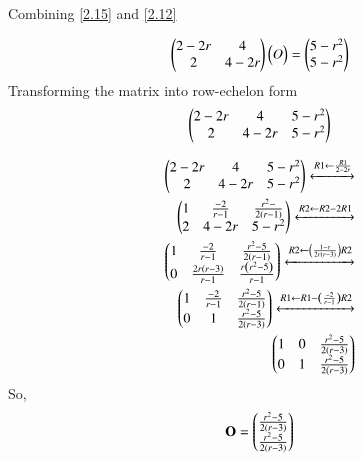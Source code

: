 \documentclass[journal,12pt,twocolumn]{IEEEtran}
\begin{document}
Combining \ref{2.15} and \ref{2.12}

\begin{align}
\begin{pmatrix}2 - 2r  &  4 \\   2 & 4 - 2r \\\end{pmatrix} \begin{pmatrix}O\end{pmatrix} = \begin{pmatrix}5 - r^2 \\ 5 - r^2 \\\end{pmatrix} \label{2.17}
\end{align}
Transforming the matrix into row-echelon form \\
\begin{align}
\begin{pmatrix}2 - 2r  &  4 &  5 - r^2 \\   2 & 4 - 2r &  5 - r^2 \\\end{pmatrix}  \label{2.18}
\end{align}

	\begin{align}
\myvec{
	2 - 2r & 4 & 5 - r^2 \\
	2 & 4 - 2r & 5 - r^2 \\
}
\xleftrightarrow[]{R1 \leftarrow \frac{R1}{2 - 2r} } \nonumber  \\
%
\myvec{
	1 & \frac{-2}{r-1} & \frac{r^2 - }{2\left( r - 1\right)} \\
	2 & 4 - 2r & 5 - r^2\\
}
\xleftrightarrow[]{R2 \leftarrow  R2 - 2R1 } \nonumber  \\
%
\myvec{
	1 & \frac{-2}{r - 1} & \frac{r^2 - 5}{2 \left( r - 1 \right)} \\
	0 & \frac{2r\left(r - 3 \right) }{ r - 1} & \frac{r \left(r^2 - 5 \right)}{r - 1}
}
\xleftrightarrow[]{R2 \leftarrow \left( \frac{1 - r}{ 2r \left( r - 3\right)}\right)R2 } \nonumber  \\
%	
\myvec{
	1 & \frac{-2}{r - 1} & \frac{r^2 - 5}{2 \left(r - 1\right)} \\
	0 & 1 & \frac{r^2 - 5}{2 \left(r - 3\right)}
}
\xleftrightarrow[]{R1 \leftarrow  R1 - \left( \frac{-2}{r - 1} \right)R2 } \nonumber   \\
\myvec{
	1 & 0 & \frac{r^2 - 5}{2 \left(r - 3\right)} \\
	0 & 1 & \frac{r^2 - 5}{2 \left(r - 3\right)}
}
\end{align}
So,
\begin{align}
\mathbf{O} = \begin{pmatrix} \frac{r^2 - 5}{2 \left(r - 3\right)} \\ \frac{r^2 - 5}{2 \left(r - 3\right)} \\\end{pmatrix} \label{2.19}
\end{align}
\end{document}
